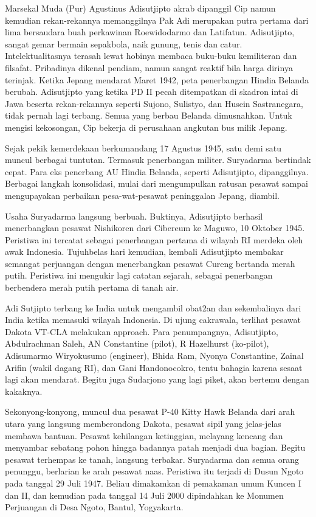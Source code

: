 {\small Marsekal Muda (Pur) Agustinus Adisutjipto akrab dipanggil Cip namun kemudian rekan-rekannya memanggilnya Pak Adi merupakan putra pertama dari lima bersaudara buah perkawinan Roewidodarmo dan Latifatun. Adisutjipto, sangat gemar bermain sepakbola, naik gunung, tenis dan catur. Intelektualitasnya terasah lewat hobinya membaca buku-buku kemiliteran dan filsafat. Pribadinya dikenal pendiam, namun sangat reaktif bila harga dirinya terinjak. Ketika Jepang mendarat Maret 1942, peta penerbangan Hindia Belanda berubah. Adisutjipto yang ketika PD II pecah ditempatkan di skadron intai di Jawa beserta rekan-rekannya seperti Sujono, Sulistyo, dan Husein Sastranegara, tidak pernah lagi terbang. Semua yang berbau Belanda dimusnahkan. Untuk mengisi kekosongan, Cip bekerja di perusahaan angkutan bus milik Jepang.

Sejak pekik kemerdekaan berkumandang 17 Agustus 1945, satu demi satu muncul berbagai tuntutan. Termasuk penerbangan militer. Suryadarma bertindak cepat. Para eks penerbang AU Hindia Belanda, seperti Adisutjipto, dipanggilnya. Berbagai langkah konsolidasi, mulai dari mengumpulkan ratusan pesawat sampai mengupayakan perbaikan pesa-wat-pesawat peninggalan Jepang, diambil.

Usaha Suryadarma langsung berbuah. Buktinya, Adisutjipto berhasil menerbangkan pesawat Nishikoren dari Cibereum ke Maguwo, 10 Oktober 1945. Peristiwa ini tercatat sebagai penerbangan pertama di wilayah RI merdeka oleh awak Indonesia. Tujuhbelas hari kemudian, kembali Adisutjipto membakar semangat perjuangan dengan menerbangkan pesawat Cureng bertanda merah putih. Peristiwa ini mengukir lagi catatan sejarah, sebagai penerbangan berbendera merah putih pertama di tanah air.

Adi Sutjipto terbang ke India untuk mengambil obat2an dan sekembalinya dari India ketika memasuki wilayah Indonesia. Di ujung cakrawala, terlihat pesawat Dakota VT-CLA melakukan approach. Para penumpangnya, Adisutjipto, Abdulrachman Saleh, AN Constantine (pilot), R Hazelhurst (ko-pilot), Adisumarmo Wiryokusumo (engineer), Bhida Ram, Nyonya Constantine, Zainal Arifin (wakil dagang RI), dan Gani Handonocokro, tentu bahagia karena sesaat lagi akan mendarat. Begitu juga Sudarjono yang lagi piket, akan bertemu dengan kakaknya.

Sekonyong-konyong, muncul dua pesawat P-40 Kitty Hawk Belanda dari arah utara yang langsung memberondong Dakota, pesawat sipil yang jelas-jelas membawa bantuan. Pesawat kehilangan ketinggian, melayang kencang dan menyambar sebatang pohon hingga badannya patah menjadi dua bagian. Begitu pesawat terhempas ke tanah, langsung terbakar. Suryadarma dan semua orang penunggu, berlarian ke arah pesawat naas.
Peristiwa itu terjadi di Dusun Ngoto pada tanggal 29 Juli 1947. Beliau dimakamkan di pemakaman umum Kuncen I dan II, dan kemudian pada tanggal 14 Juli 2000 dipindahkan ke Monumen Perjuangan di Desa Ngoto, Bantul, Yogyakarta.
}
\newpage
